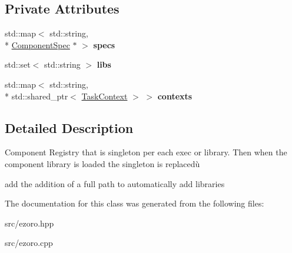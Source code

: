 \subsection*{Private Attributes}
\begin{DoxyCompactItemize}
\item 
\hypertarget{classcoco_1_1_component_registry_a28ce74205cca34a3d03c7916629c2f58}{std\-::map$<$ std\-::string, \\*
\hyperlink{classcoco_1_1_component_spec}{Component\-Spec} $\ast$ $>$ {\bfseries specs}}\label{classcoco_1_1_component_registry_a28ce74205cca34a3d03c7916629c2f58}

\item 
\hypertarget{classcoco_1_1_component_registry_a62eba9c111c9df9405d5c0c7500c91b1}{std\-::set$<$ std\-::string $>$ {\bfseries libs}}\label{classcoco_1_1_component_registry_a62eba9c111c9df9405d5c0c7500c91b1}

\item 
\hypertarget{classcoco_1_1_component_registry_aab792483941bb3b14655cf297fe44034}{std\-::map$<$ std\-::string, \\*
std\-::shared\-\_\-ptr$<$ \hyperlink{classcoco_1_1_task_context}{Task\-Context} $>$ $>$ {\bfseries contexts}}\label{classcoco_1_1_component_registry_aab792483941bb3b14655cf297fe44034}

\end{DoxyCompactItemize}


\subsection{Detailed Description}
Component Registry that is singleton per each exec or library. Then when the component library is loaded the singleton is replacedù

add the addition of a full path to automatically add libraries 

The documentation for this class was generated from the following files\-:\begin{DoxyCompactItemize}
\item 
src/ezoro.\-hpp\item 
src/ezoro.\-cpp\end{DoxyCompactItemize}
